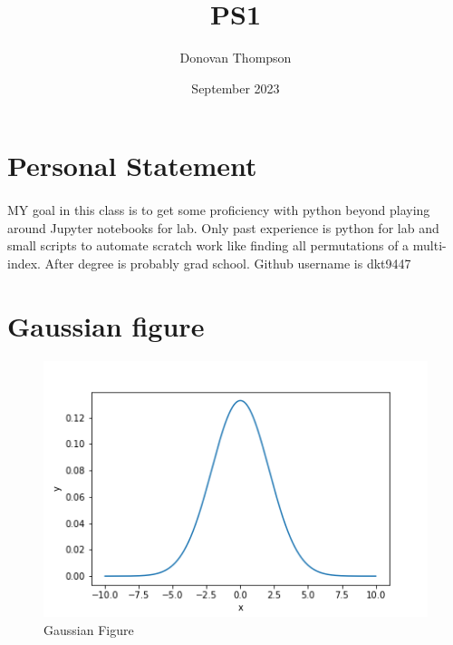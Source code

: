 \documentclass{article}
\title{PS1}
\author{Donovan Thompson }
\date{September 2023}
\begin{document}
\maketitle
\section{Personal Statement}
\paragraph{}
MY goal in this class is to get some proficiency with python beyond playing around Jupyter notebooks for lab. Only past experience is python for lab and small scripts to automate scratch work like finding all permutations of a multi-index. After degree is probably grad school. Github username is dkt9447\section{Gaussian figure}
\begin{figure}
    \centering
    \includegraphics[width=\textwidth,height=\textheight,keepaspectratio]{gaussian.png}
    \caption{Gaussian Figure}
    \label{fig:enter-label}
\end{figure}
\end{document}
